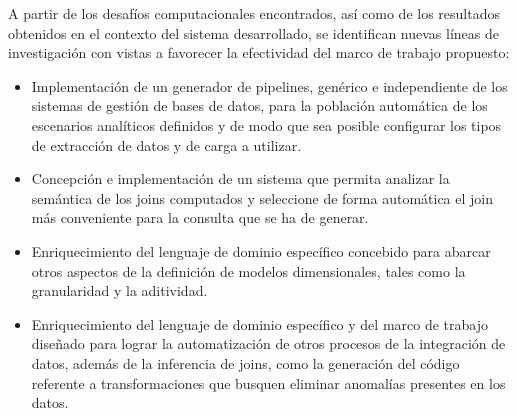 \begin{recomendations}
A partir de los desafíos computacionales encontrados, así como de los resultados
obtenidos en el contexto del sistema desarrollado, se identifican nuevas líneas de investigación con vistas a 
favorecer la efectividad del marco de trabajo propuesto:

\begin{itemize}
    \item Implementaci\'on de un generador de pipelines, gen\'erico e independiente de los sistemas 
        de gestión de bases de datos, para la poblaci\'on automática de los escenarios analíticos definidos y de 
        modo que sea posible configurar los tipos de extracción de datos y de carga a utilizar.
        
    \item Concepción e implementación de un sistema que permita 
        analizar la semántica de los joins computados y seleccione de forma autom\'atica el join 
        m\'as conveniente para la consulta que se ha de generar.

    \item Enriquecimiento del lenguaje de dominio espec\'ifico concebido para abarcar otros aspectos 
        de la definición de modelos dimensionales, tales como la granularidad y la aditividad. 
        
    \item Enriquecimiento del lenguaje de dominio espec\'ifico y del marco de trabajo diseñado 
        para lograr la automatizaci\'on de otros procesos de la integraci\'on de datos, además de la inferencia 
        de joins, como la generación del c\'odigo referente a transformaciones que busquen eliminar anomal\'ias 
        presentes en los datos. 
\end{itemize}

\end{recomendations}
